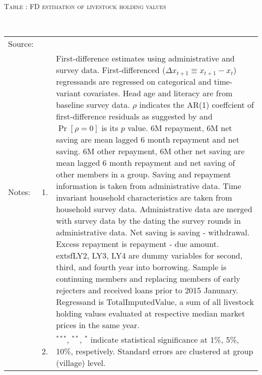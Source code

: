 \hspace{-1cm}\begin{minipage}[t]{14cm}
\hfil\textsc{\normalsize Table \thetable: FD estimation of livestock holding values\label{tab FD livestock original HH}}\\
\setlength{\tabcolsep}{1pt}
\setlength{\baselineskip}{8pt}
\renewcommand{\arraystretch}{.55}
\hfil{}\\
\renewcommand{\arraystretch}{.8}
\setlength{\tabcolsep}{1pt}
\begin{tabular}{>{\hfill\scriptsize}p{1cm}<{}>{\hfill\scriptsize}p{.25cm}<{}>{\scriptsize}p{12cm}<{\hfill}}
Source:& \multicolumn{2}{l}{\scriptsize Estimated with GUK administrative and survey data.}\\
Notes: & 1. & First-difference estimates using administrative and survey data. First-differenced ($\Delta x_{t+1}\equiv x_{t+1} - x_{t}$) regressands are regressed on categorical and time-variant covariates. Head age and literacy are from baseline survey data. $\rho$ indicates the AR(1) coeffcient of first-difference residuals as suggested by \citet[][10.71]{Wooldridge2010} and $\Pr[\rho=0]$ is its $p$ value. \textsf{6M repayment, 6M net saving} are mean lagged 6 month repayment and net saving. \textsf{6M other repayment, 6M other net saving} are mean lagged 6 month repayment and net saving of other members in a group. Saving and repayment information is taken from administrative data. Time invariant household characteristics are taken from household survey data. Administrative data are merged with survey data by the dating the survey rounds in administrative data. Net saving is saving - withdrawal. Excess repayment is repayment - due amount. 	extsf{LY2, LY3, LY4} are dummy variables for second, third, and fourth year into borrowing. Sample is continuing members and replacing members of early rejecters and received loans prior to 2015 Janunary. Regressand is \textsf{TotalImputedValue}, a sum of all livestock holding values evaluated at respective median market prices in the same year. \\
& 2. & ${}^{***}$, ${}^{**}$, ${}^{*}$ indicate statistical significance at 1\%, 5\%, 10\%, respetively. Standard errors are clustered at group (village) level.
\end{tabular}
\end{minipage}

